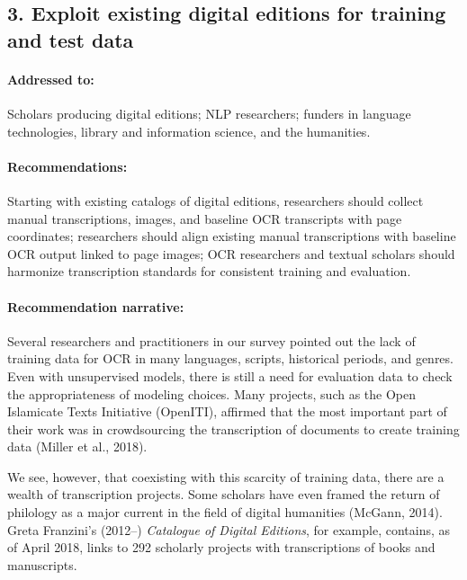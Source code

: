 \documentclass[twoside,11pt]{report}
\begin{document}
\subsection{3. Exploit existing digital editions for training and test data}
\label{sec:rec-editions}

\paragraph{Addressed to:} Scholars producing digital editions; NLP researchers; funders in language technologies, library and information science, and the humanities.

\paragraph{Recommendations:} Starting with existing catalogs of digital editions, researchers should collect manual transcriptions, images, and baseline OCR transcripts with page coordinates; researchers should align existing manual transcriptions with baseline OCR output linked to page images; OCR researchers and textual scholars should harmonize transcription standards for consistent training and evaluation.

\paragraph{Recommendation narrative:}

Several researchers and practitioners in our survey pointed out the lack of training data for OCR in many languages, scripts, historical periods, and genres. Even with unsupervised models, there is still a need for evaluation data to check the appropriateness of modeling choices. Many projects, such as the Open Islamicate Texts Initiative (OpenITI), affirmed that the most important part of their work was in crowdsourcing the transcription of documents to create training data (Miller et al., 2018).

We see, however, that coexisting with this scarcity of training data, there are a wealth of transcription projects. Some scholars have even framed the return of philology as a major current in the field of digital humanities (McGann, 2014). Greta Franzini's (2012--) \emph{Catalogue of Digital Editions}, for example, contains, as of April 2018, links to 292 scholarly projects with transcriptions of books and manuscripts.
\end{document}
